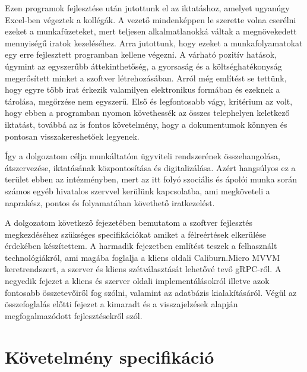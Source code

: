 \documentclass[
]{thesis-ekf}
\theoremstyle{definition}
\theoremstyle{remark}
\begin{document}
Ezen programok fejlesztése után jutottunk el az iktatáshoz, amelyet ugyanúgy Excel-ben végeztek a kollégák. A vezető mindenképpen le szerette volna cserélni ezeket a munkafüzeteket, mert teljesen alkalmatlanokká váltak a megnövekedett mennyiségű iratok kezeléséhez. Arra jutottunk, hogy ezeket a munkafolyamatokat egy erre fejlesztett programban kellene végezni. A várható pozitív hatások, úgymint az egyszerűbb áttekinthetőség, a gyorsaság és a költséghatékonyság megerősített minket a szoftver létrehozásában. Arról még említést se tettünk, hogy egyre több irat érkezik valamilyen elektronikus formában és ezeknek a tárolása, megőrzése nem egyszerű. Első és legfontosabb vágy, kritérium az volt, hogy ebben a programban nyomon követhessék az összes telephelyen keletkező iktatást, továbbá az is fontos követelmény, hogy a dokumentumok könnyen és pontosan visszakereshetőek legyenek.

Így a dolgozatom célja munkáltatóm ügyviteli rendszerének összehangolása, átszervezése, iktatásának központosítása és digitalizálása. Azért hangsúlyos ez a terület ebben az intézményben, mert az itt folyó szociális és ápolói munka során számos egyéb hivatalos szervvel kerülünk kapcsolatba, ami megköveteli a naprakész, pontos és folyamatában követhető iratkezelést.

A dolgozatom következő fejezetében bemutatom a szoftver fejlesztés megkezdéséhez szükséges specifikációkat amiket a félreértések elkerülése érdekében készítettem. A harmadik fejezetben említést teszek a felhasznált technológiákról, ami magába foglalja a kliens oldali Caliburn.Micro MVVM keretrendszert, a szerver és kliens szétválasztását lehetővé tevő gRPC-ről. A negyedik fejezet a kliens és szerver oldali implementálásokról illetve azok fontosabb összetevőiről fog szólni, valamint az adatbázis kialakításáról. Végül az összefoglalás előtti fejezet a kimaradt és a visszajelzések alapján megfogalmazódott fejlesztésekről szól. 

\chapter{Követelmény specifikáció}
\end{document}
